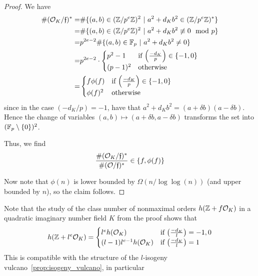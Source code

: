 \begin{proof}
    We have
    \begin{align*}
        \#(\mathcal{O}_K/\mathfrak{f})^* =& \#\{ (a, b) \in (\mathbb{Z}/p^e\mathbb{Z})^2 \ | \ a^2 + d_K b^2 \in (\mathbb{Z}/p^e\mathbb{Z})^* \} \\
        =& \#\{ (a, b) \in (\mathbb{Z}/p^e\mathbb{Z})^2 \ | \ a^2 + d_K b^2 \not\equiv 0 \mod p \} \\
        =& p^{2e - 2} \#\{ (a, b) \in \mathbb{F}_p \ | \ a^2 + d_K b^2 \neq 0 \} \\
        =& p^{2e - 2} \cdot \begin{cases}
            p^2 - 1 & \text{if $\left(\frac {-d_K} p \right) \in \{ -1, 0 \}$} \\
            (p - 1)^2 & \text{otherwise}
        \end{cases} \\
        =& \begin{cases}
            f \phi(f) & \text{if $\left(\frac {-d_K} p \right) \in \{ -1, 0 \}$} \\
            \phi(f)^2 & \text{otherwise}
        \end{cases}
    \end{align*}
    since in the case $(-d_K/p) = -1$, have that $a^2 + d_K b^2 = (a + \delta b)(a - \delta b)$.
    Hence the change of variables $(a, b) \mapsto (a + \delta b, a - \delta b)$ transforms the set into $(\mathbb{F}_p \setminus \{0\})^2$.

    Thus, we find
    \begin{equation*}
        \frac {\#(\mathcal{O}_K/\mathfrak{f})^*} {\#(\mathcal{O}/\mathfrak{f})^*} \in \{ f, \phi(f) \}
    \end{equation*}

    Now note that $\phi(n)$ is lower bounded by $\Omega(n/\log\log(n))$ (and upper bounded by $n$), so the claim follows.
\end{proof}
Note that the study of the class number of nonmaximal orders $h(\mathbb{Z} + f\mathcal{O}_K)$ in a quadratic imaginary number field $K$ from the proof shows that
\begin{equation*}
    h(\mathbb{Z} + l^e\mathcal{O}_K) = \begin{cases}
        l^e h(\mathcal{O}_K) & \text{if $\left(\frac {-d_K} l\right) = -1, 0$} \\
        (l - 1) l^{e - 1} h(\mathcal{O}_K) & \text{if $\left(\frac {-d_K} l\right) = 1$}
    \end{cases}
\end{equation*}
This is compatible with the structure of the $l$-isogeny vulcano~\ref{prop:isogeny_vulcano}, in particular
